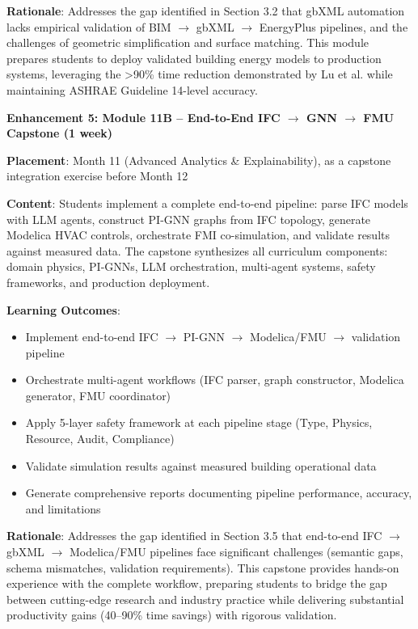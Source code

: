 \documentclass[12pt,a4paper]{article}
\begin{document}
\textbf{Rationale}: Addresses the gap identified in Section 3.2 that gbXML automation lacks empirical validation of BIM $\rightarrow$ gbXML $\rightarrow$ EnergyPlus pipelines, and the challenges of geometric simplification and surface matching. This module prepares students to deploy validated building energy models to production systems, leveraging the >90\% time reduction demonstrated by Lu et al. while maintaining ASHRAE Guideline 14-level accuracy.

\textbf{Enhancement 5: Module 11B -- End-to-End IFC $\rightarrow$ GNN $\rightarrow$ FMU Capstone (1 week)}

\textbf{Placement}: Month 11 (Advanced Analytics \& Explainability), as a capstone integration exercise before Month 12

\textbf{Content}: Students implement a complete end-to-end pipeline: parse IFC models with LLM agents, construct PI-GNN graphs from IFC topology, generate Modelica HVAC controls, orchestrate FMI co-simulation, and validate results against measured data. The capstone synthesizes all curriculum components: domain physics, PI-GNNs, LLM orchestration, multi-agent systems, safety frameworks, and production deployment.

\textbf{Learning Outcomes}:
\begin{itemize}
  \item Implement end-to-end IFC $\rightarrow$ PI-GNN $\rightarrow$ Modelica/FMU $\rightarrow$ validation pipeline
  \item Orchestrate multi-agent workflows (IFC parser, graph constructor, Modelica generator, FMU coordinator)
  \item Apply 5-layer safety framework at each pipeline stage (Type, Physics, Resource, Audit, Compliance)
  \item Validate simulation results against measured building operational data
  \item Generate comprehensive reports documenting pipeline performance, accuracy, and limitations
\end{itemize}

\textbf{Rationale}: Addresses the gap identified in Section 3.5 that end-to-end IFC $\rightarrow$ gbXML $\rightarrow$ Modelica/FMU pipelines face significant challenges (semantic gaps, schema mismatches, validation requirements). This capstone provides hands-on experience with the complete workflow, preparing students to bridge the gap between cutting-edge research and industry practice while delivering substantial productivity gains (40--90\% time savings) with rigorous validation.
\end{document}
